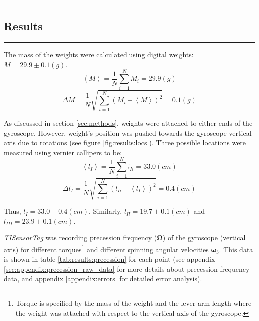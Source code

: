 {\color{gray}\hrule}
\begin{center}
\section{Results} \label{sec:results}
\bigskip
\end{center}
{\color{gray}\hrule}

\begin{multicols}{2} 
The mass of the weights were calculated using digital weights: $M = 29.9 \pm 0.1 (g)$.
\begin{equation} \label{eq:results:weight}
  \left\langle M \right\rangle = \frac{1}{N}\sum\limits_{i=1}^{N}M_{i} = 29.9 (g)
\end{equation}
\begin{equation} \label{eq:results:weight_err}
  \Delta M = \frac{1}{N}\sqrt{\sum\limits_{i=1}^{N}(M_{i} - \left\langle M \right\rangle)^{2}} = 0.1 (g)
\end{equation}

As discussed in section \ref{sec:methods}, weights were attached to either ends of the gyroscope. However, weight's position was pushed towards the gyroscope vertical axis due to rotations (see figure \ref{fig:results:locs}). Three possible locations were measured using vernier callipers to be:
\begin{equation*}
  \left\langle l_{I} \right\rangle = \frac{1}{N}\sum\limits_{i=1}^{N}l_{Ii} = 33.0 (cm)
\end{equation*}
\begin{equation} \label{eq:results:l_err}
  \Delta l_{I} = \frac{1}{N}\sqrt{\sum\limits_{i=1}^{N}(l_{Ii} - \left\langle l_{I} \right\rangle)^{2}} = 0.4 (cm)
\end{equation}

Thus, $l_{I} = 33.0 \pm 0.4 (cm)$. Similarly, $l_{II} = 19.7 \pm 0.1 (cm)$ and $l_{III} = 23.9 \pm 0.1 (cm)$.

\emph{TISensorTag} was recording precession frequency ($\boldsymbol\Omega$) of the gyroscope (vertical axis) for different torques\footnote{Torque is specified by the mass of the weight and the lever arm length where the weight was attached with respect to the vertical axis of the gyroscope.} and different spinning angular velocities $\boldsymbol\omega_{3}$. This data is shown in table \ref{tab:results:precession} for each point (see appendix \ref{sec:appendix:precession_raw_data} for more details about precession frequency data, and appendix \ref{appendix:errors} for detailed error analysis).

\end{multicols}

